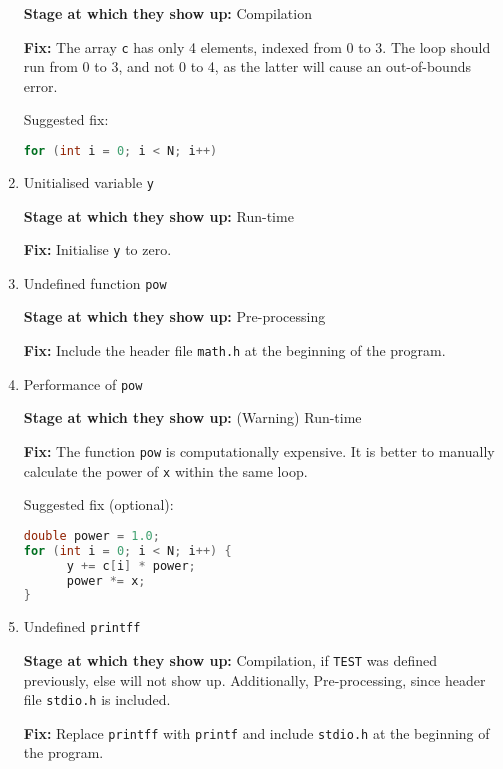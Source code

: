 \begin{enumerate}
            \textbf{Stage at which they show up:}
            Compilation

            \textbf{Fix:}
            The array \texttt{c} has only 4 elements, indexed from 0 to 3.
            The loop should run from 0 to 3, and not 0 to 4, as the latter will cause an out-of-bounds error.

            Suggested fix:
            \begin{lstlisting}[language=C, frame=single]
for (int i = 0; i < N; i++)
            \end{lstlisting}

      \item Unitialised variable \texttt{y}

            \textbf{Stage at which they show up:}
            Run-time

            \textbf{Fix:}
            Initialise \texttt{y} to zero.

      \item Undefined function \texttt{pow}

            \textbf{Stage at which they show up:}
            Pre-processing

            \textbf{Fix:}
            Include the header file \texttt{math.h} at the beginning of the program.

      \item Performance of \texttt{pow}

            \textbf{Stage at which they show up:}
            (Warning) Run-time

            \textbf{Fix:}
            The function \texttt{pow} is computationally expensive.
            It is better to manually calculate the power of \texttt{x} within the same loop.

            Suggested fix (optional):
            \begin{lstlisting}[language=C, frame=single]
double power = 1.0;
for (int i = 0; i < N; i++) {
      y += c[i] * power;
      power *= x;
}
            \end{lstlisting}

      \item Undefined \texttt{printff}

            \textbf{Stage at which they show up:}
            Compilation, if \texttt{TEST} was defined previously, else will not show up.
            Additionally, Pre-processing, since header file \texttt{stdio.h} is included.

            \textbf{Fix:}
            Replace \texttt{printff} with \texttt{printf} and include \texttt{stdio.h} at the beginning of the program.


\end{enumerate}
